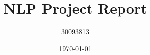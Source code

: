 \documentclass[manuscript,screen,review]{acmart}
\author{30093813}
\date{\today}
\title{NLP Project Report}
\begin{document}
\maketitle
\citep{distilbert}


\end{document}
